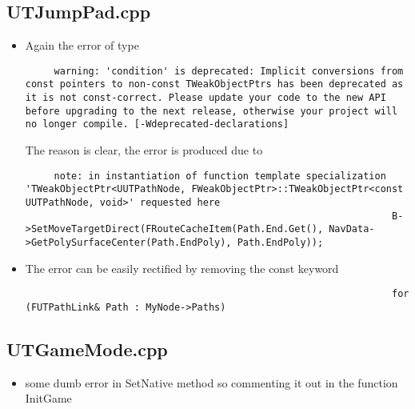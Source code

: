 \documentclass{article}
\begin{document}
\subsection{UTJumpPad.cpp}
\begin{itemize}
\item Again the error of type
  \lstset{language=c++}
  \begin{lstlisting}
     warning: 'condition' is deprecated: Implicit conversions from const pointers to non-const TWeakObjectPtrs has been deprecated as it is not const-correct. Please update your code to the new API before upgrading to the next release, otherwise your project will no longer compile. [-Wdeprecated-declarations]
   \end{lstlisting}
   The reason is clear, the error is produced due to
   \lstset{language=c++}
   \begin{lstlisting}
     note: in instantiation of function template specialization 'TWeakObjectPtr<UUTPathNode, FWeakObjectPtr>::TWeakObjectPtr<const UUTPathNode, void>' requested here
                                                                B->SetMoveTargetDirect(FRouteCacheItem(Path.End.Get(), NavData->GetPolySurfaceCenter(Path.EndPoly), Path.EndPoly));
                                                              \end{lstlisting}
                                                            \item The error can be easily rectified by removing the const keyword
                                                              \lstset{language=c++}
                                                              \begin{lstlisting}
                                                                for (FUTPathLink& Path : MyNode->Paths)
                                                              \end{lstlisting}
                                                            \end{itemize}
                                                            \subsection{UTGameMode.cpp}
                                                            \begin{itemize}
                                                            \item some dumb error in SetNative method so commenting it out in the function InitGame
                                                            \end{itemize}
\end{document}
